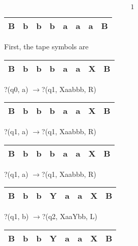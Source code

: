 

\noindent 

\noindent 

\noindent 

\noindent 
\[1\] 


\begin{tabular}{|p{0.2in}|p{0.2in}|p{0.2in}|p{0.2in}|p{0.2in}|p{0.2in}|p{0.2in}|p{0.2in}|} \hline 
B & b & b & b & a & a & a & B \\ \hline 
\end{tabular}

First, the tape symbols are

 

\begin{tabular}{|p{0.2in}|p{0.2in}|p{0.2in}|p{0.2in}|p{0.2in}|p{0.2in}|p{0.2in}|p{0.2in}|} \hline 
B & b & b & b & a & a & X & B \\ \hline 
\end{tabular}

?(q0, a) $\to $?(q1, Xaabbb, R)

\noindent 

\begin{tabular}{|p{0.2in}|p{0.2in}|p{0.2in}|p{0.2in}|p{0.2in}|p{0.2in}|p{0.2in}|p{0.2in}|} \hline 
B & b & b & b & a & a & X & B \\ \hline 
\end{tabular}

?(q1, a) $\to $?(q1, Xaabbb, R)

\noindent 

\begin{tabular}{|p{0.2in}|p{0.2in}|p{0.2in}|p{0.2in}|p{0.2in}|p{0.2in}|p{0.2in}|p{0.2in}|} \hline 
B & b & b & b & a & a & X & B \\ \hline 
\end{tabular}

?(q1, a) $\to $?(q1, Xaabbb, R)

\noindent 

\begin{tabular}{|p{0.2in}|p{0.2in}|p{0.2in}|p{0.2in}|p{0.2in}|p{0.2in}|p{0.2in}|p{0.2in}|} \hline 
B & b & b & Y & a & a & X & B \\ \hline 
\end{tabular}

?(q1, b) $\to $?(q2, XaaYbb, L)

\noindent 

\begin{tabular}{|p{0.2in}|p{0.2in}|p{0.2in}|p{0.2in}|p{0.2in}|p{0.2in}|p{0.2in}|p{0.2in}|} \hline 
B & b & b & Y & a & a & X & B \\ \hline 
\end{tabular}

